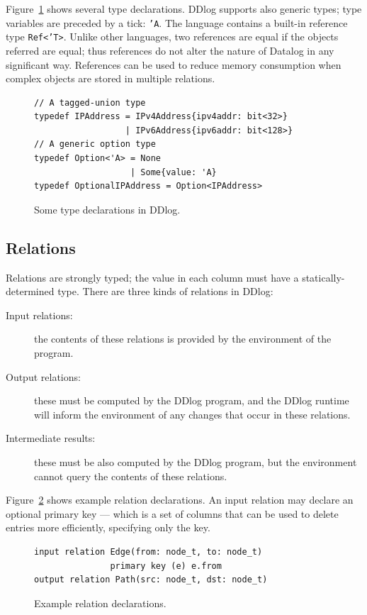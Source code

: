 Figure~\ref{fig:types} shows several type declarations.  DDlog
supports also generic types; type variables are preceded by a tick:
\texttt{'A}.  The language contains a built-in reference type
\texttt{Ref<'T>}.  Unlike other languages, two references are equal if
the objects referred are equal; thus references do not alter the
nature of Datalog in any significant way.  References can be used to
reduce memory consumption when complex objects are stored in multiple
relations.

\begin{figure}[t]
  \small
\begin{lstlisting}[language=ddlog]
// A tagged-union type
typedef IPAddress = IPv4Address{ipv4addr: bit<32>}
                  | IPv6Address{ipv6addr: bit<128>}
// A generic option type
typedef Option<'A> = None
                   | Some{value: 'A}
typedef OptionalIPAddress = Option<IPAddress>                   
\end{lstlisting}
\caption{Some type declarations in DDlog.\label{fig:types}}
\end{figure}

\subsection{Relations}

Relations are strongly typed; the value in each column must have a
statically-determined type.  There are three kinds of relations in
DDlog:
\begin{description}
\item[Input relations:] the contents of these relations is provided by
  the environment of the program.
\item[Output relations:] these must be computed by the DDlog program, and the
  DDlog runtime will inform the environment of any changes that
  occur in these relations.
\item[Intermediate results:] these must be also computed by the DDlog
  program, but the environment cannot query the contents of these
  relations.
\end{description}

Figure~\ref{fig:relations} shows example relation declarations.  An
input relation may declare an optional primary key --- which is a set
of columns that can be used to delete entries more efficiently,
specifying only the key.

\begin{figure}[t]
  \small
  \begin{lstlisting}[language=ddlog]
input relation Edge(from: node_t, to: node_t)
               primary key (e) e.from
output relation Path(src: node_t, dst: node_t)
  \end{lstlisting}
  \caption{Example relation declarations.\label{fig:relations}}
\end{figure}

